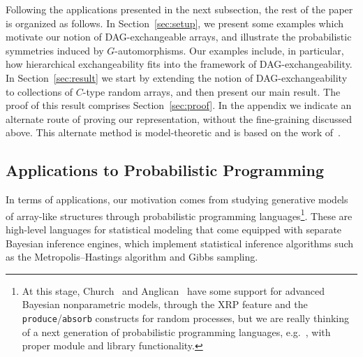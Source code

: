\documentclass[AHL,Unicode,longabstracts,published]{cedram}
\begin{document}
Following the applications presented in the next subsection, the rest of the paper is organized as follows. In Section~\ref{sec:setup}, we present some examples which motivate our notion of DAG-exchangeable arrays, and illustrate the probabilistic symmetries induced by $G$-automorphisms. Our examples include, in particular, how hierarchical exchangeability fits into the framework of DAG-exchangeability. In Section~\ref{sec:result} we start by extending the notion of DAG-exchangeability to collections of $C$-type random arrays, and then present our main result. The proof of this result comprises Section~\ref{sec:proof}. In the appendix we indicate an alternate route of proving our representation, without the fine-graining discussed above. This alternate method is model-theoretic and is based on the work of~\cite{crane2017relative}.



\subsection{Applications to Probabilistic Programming}\label{sec:probprog}

In terms of applications, our motivation comes from studying generative models of array-like structures through probabilistic programming languages\footnote{At this stage, Church~\cite{church2008} and Anglican~\cite{TolpinMYW16,wood-aistats-2014} have some support for advanced Bayesian nonparametric models, through the XRP feature and the \texttt{produce}/\texttt{absorb} constructs for random processes, but we are really thinking of a next generation of probabilistic programming languages, e.g.~\cite{statonetal2017pps}, with proper module and library functionality.}. These are high-level languages for statistical modeling that come equipped with separate Bayesian inference engines, which implement statistical inference algorithms such as the Metropolis--Hastings algorithm and Gibbs sampling.
\end{document}
